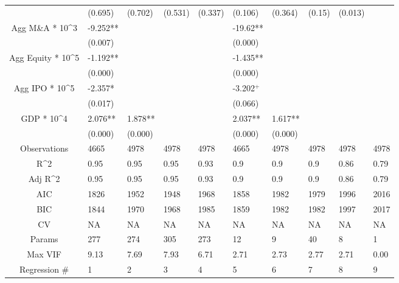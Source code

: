 \documentclass{article}
\begin{document}
\begin{table}[H]
\begin{tabular}{|clllllllll|}
   & (0.695) & (0.702) & (0.531) & (0.337) & (0.106) & (0.364) & (0.15) & (0.013) &  \\
  Agg M\&A * 10^3 & -9.252** &  &  &  & -19.62** &  &  &  &  \\
   & (0.007) &  &  &  & (0.000) &  &  &  &  \\
  Agg Equity * 10^5 & -1.192** &  &  &  & -1.435** &  &  &  &  \\
   & (0.000) &  &  &  & (0.000) &  &  &  &  \\
  Agg IPO * 10^5 & -2.357* &  &  &  & -3.202$^{+}$ &  &  &  &  \\
   & (0.017) &  &  &  & (0.066) &  &  &  &  \\
  GDP * 10^4 & 2.076** & 1.878** &  &  & 2.037** & 1.617** &  &  &  \\
   & (0.000) & (0.000) &  &  & (0.000) & (0.000) &  &  &  \\
  \hline
 Observations & 4665 & 4978 & 4978 & 4978 & 4665 & 4978 & 4978 & 4978 & 4978 \\
  R^2 & 0.95 & 0.95 & 0.95 & 0.93 & 0.9 & 0.9 & 0.9 & 0.86 & 0.79 \\
  Adj R^2 & 0.95 & 0.95 & 0.95 & 0.93 & 0.9 & 0.9 & 0.9 & 0.86 & 0.79 \\
  AIC & 1826 & 1952 & 1948 & 1968 & 1858 & 1982 & 1979 & 1996 & 2016 \\
  BIC & 1844 & 1970 & 1968 & 1985 & 1859 & 1982 & 1982 & 1997 & 2017 \\
  CV & NA & NA & NA & NA & NA & NA & NA & NA & NA \\
  Params & 277 & 274 & 305 & 273 & 12 & 9 & 40 & 8 & 1 \\
  Max VIF & 9.13 & 7.69 & 7.93 & 6.71 & 2.71 & 2.73 & 2.77 & 2.71 & 0.00 \\
  Regression \# & 1 & 2 & 3 & 4 & 5 & 6 & 7 & 8 & 9 \\
   \hline
\end{tabular}

\end{table}
\end{document}
